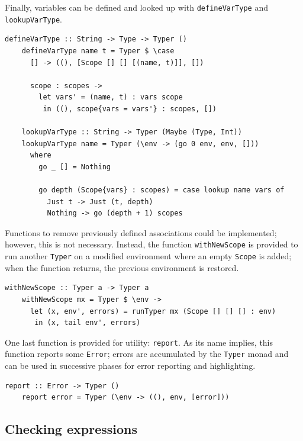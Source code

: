 \documentclass[UdineBachThesis,american,11pt]{PhdThesis}
\begin{document}
  Finally, variables can be defined and looked up with
  \mbox{\texttt{defineVarType}} and \mbox{\texttt{lookupVarType}}.

  \begin{Verbatim}[gobble=4,fontsize=\small]
    defineVarType :: String -> Type -> Typer ()
    defineVarType name t = Typer $ \case
      [] -> ((), [Scope [] [] [(name, t)]], [])

      scope : scopes ->
        let vars' = (name, t) : vars scope
         in ((), scope{vars = vars'} : scopes, [])

    lookupVarType :: String -> Typer (Maybe (Type, Int))
    lookupVarType name = Typer (\env -> (go 0 env, env, []))
      where
        go _ [] = Nothing

        go depth (Scope{vars} : scopes) = case lookup name vars of
          Just t -> Just (t, depth)
          Nothing -> go (depth + 1) scopes
  \end{Verbatim}

  Functions to remove previously defined associations could be implemented;
  however, this is not necessary. Instead, the function
  \mbox{\texttt{withNewScope}} is provided to run another \mbox{\texttt{Typer}}
  on a modified environment where an empty \mbox{\texttt{Scope}} is added; when
  the function returns, the previous environment is restored.

  \begin{Verbatim}[gobble=4,fontsize=\small]
    withNewScope :: Typer a -> Typer a
    withNewScope mx = Typer $ \env ->
      let (x, env', errors) = runTyper mx (Scope [] [] [] : env)
       in (x, tail env', errors)
  \end{Verbatim}

  One last function is provided for utility: \mbox{\texttt{report}}. As its name
  implies, this function reports some \mbox{\texttt{Error}}; errors are
  accumulated by the \mbox{\texttt{Typer}} monad and can be used in successive
  phases for error reporting and highlighting.

  \begin{Verbatim}[gobble=4,fontsize=\small]
    report :: Error -> Typer ()
    report error = Typer (\env -> ((), env, [error]))
  \end{Verbatim}

  \newpage

  \subsection{Checking expressions}
\end{document}
